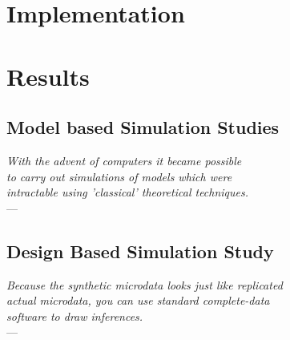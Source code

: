 \documentclass[
		openright,titlepage,numbers=noenddot,headinclude,1headlines,
                footinclude=true,cleardoublepage=empty,
                BCOR=5mm,paper=a4,fontsize=11pt, %
                american, %
                ]{scrreprt}
\begin{document}







\part{Implementation}\label{part:implementation}





\part{Results}\label{part:results}

\chapter{Model based Simulation Studies}
\begin{flushright}{\slshape
With the advent of computers it became possible \\
to carry out simulations of models which were \\
intractable using 'classical' theoretical techniques.}\\ \medskip
--- \textcite[xv]{Lan14}
\end{flushright}


\label{chap:results_model_based}





\chapter{Design Based Simulation Study}\label{chap:results_design_based}

\begin{flushright}{\slshape
Because the synthetic microdata looks just like replicated \\
actual microdata, you can use standard complete\hyp{}data \\
software to draw inferences.
}\\ \medskip
--- \textcite{Rub93}
\end{flushright}
\end{document}

